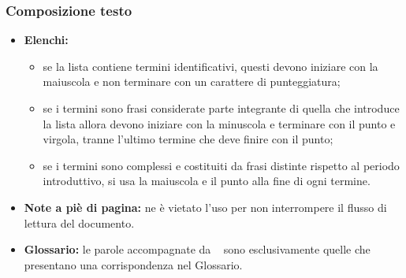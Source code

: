 {{		\subsubsection{Composizione testo}{
			\begin{itemize}
				\item \textbf{Elenchi:}
				\begin{itemize}
					\item se la lista contiene termini identificativi, questi devono iniziare con la maiuscola e non terminare con un carattere di punteggiatura;
					\item se i termini sono frasi considerate parte integrante di quella che introduce la lista allora devono iniziare con la minuscola e terminare con il punto e virgola, tranne l'ultimo termine che deve finire con il punto;
					\item se i termini sono complessi e costituiti da frasi distinte rispetto al periodo introduttivo, si usa la maiuscola e il punto alla fine di ogni termine.
				\end{itemize}
				\item \textbf{Note a piè di pagina:} ne è vietato l'uso per non interrompere il flusso di lettura del documento.
				\item \textbf{Glossario:} le parole accompagnate da \g~ sono esclusivamente quelle che presentano una corrispondenza nel Glossario.
			\end{itemize}	
		}
	}

}
